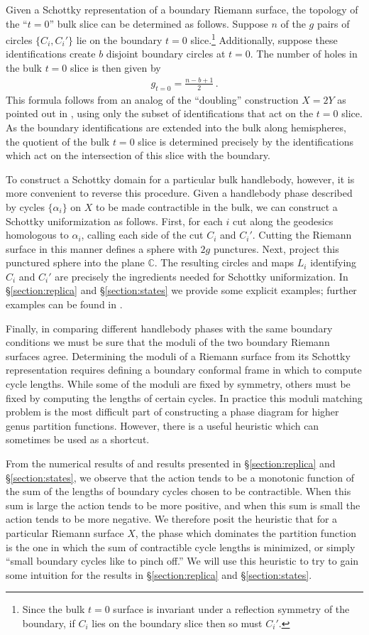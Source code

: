 \documentclass[letterpaper,12pt]{article}
\newcommand{\ban}[1]{\begin{align}#1\end{align}}
\begin{document}
Given a Schottky representation of a boundary Riemann surface, the topology of the ``$t=0$'' bulk slice can be determined as follows. Suppose $n$ of the $g$ pairs of circles $\{C_i,C_i'\}$ lie on the boundary $t=0$ slice.\footnote{Since the bulk $t=0$ surface is invariant under a reflection symmetry of the boundary, if $C_i$ lies on the boundary slice then so must $C_i'$.} Additionally, suppose these identifications create $b$ disjoint boundary circles at $t=0$. The number of holes in the bulk $t=0$ slice is then given by
\ban{
g_{t=0} =\frac{ n-b+1}2\, \label{eq:bulkgenus}.
}
This formula follows from an analog of the ``doubling'' construction $X = 2Y$ as pointed out in \cite{Krasnov2}, using only the subset of identifications that act on the $t=0$ slice. As the boundary identifications are extended into the bulk along hemispheres, the quotient of the bulk $t=0$ slice is determined precisely by the identifications which act on the intersection of this slice with the boundary.

To construct a Schottky domain for a particular bulk handlebody, however, it is more convenient to reverse this procedure. Given a handlebody phase described by cycles $\{\alpha_i\}$ on $X$ to be made contractible in the bulk, we can construct a Schottky uniformization as follows. First, for each $i$ cut along the geodesics homologous to $\alpha_i$, calling each side of the cut $C_i$ and $C_i'$. Cutting the Riemann surface in this manner defines a sphere with $2g$ punctures. Next, project this punctured sphere into the plane $\mathbb C$. The resulting circles and maps $L_i$ identifying $C_i$ and $C_i'$ are precisely the ingredients needed for Schottky uniformization. In \S \ref{section:replica} and \S\ref{section:states} we provide some explicit examples; further examples can be found in \cite{MRW}.


Finally, in comparing different handlebody phases with the same boundary conditions we must be sure that the moduli of the two boundary Riemann surfaces agree. Determining the moduli of a Riemann surface from its Schottky representation requires defining a boundary conformal frame in which to compute cycle lengths. While some of the moduli are fixed by symmetry, others must be fixed by computing the lengths of certain cycles. In practice this moduli matching problem is the most difficult part of constructing a phase diagram for higher genus partition functions. However, there is a useful heuristic which can sometimes be used as a shortcut.

From the numerical results of \cite{MRW, cones} and results presented in \S \ref{section:replica} and \S\ref{section:states}, we observe that the action tends to be a monotonic function of the sum of the lengths of boundary cycles chosen to be contractible. When this sum is large the action tends to be more positive, and when this sum is small the action tends to be more negative. We therefore posit the heuristic that for a particular Riemann surface $X$, the phase which dominates the partition function is the one in which the sum of contractible cycle lengths is minimized, or simply ``small boundary cycles like to pinch off.'' We will use this heuristic to try to gain some intuition for the results in \S \ref{section:replica} and \S\ref{section:states}.
\end{document}
